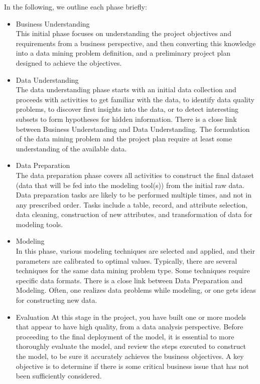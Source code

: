 In the following, we outline each phase briefly:
\begin{itemize}
\item Business Understanding\\
This initial phase focuses on understanding the project objectives and requirements from a
business perspective, and then converting this knowledge into a data mining problem
definition, and a preliminary project plan designed to achieve the objectives.
\item Data Understanding\\
The data understanding phase starts with an initial data collection and proceeds with activities
to get familiar with the data, to identify data quality problems, to discover first
insights into the data, or to detect interesting subsets to form hypotheses for hidden
information.
There is a close link between Business Understanding and Data Understanding. The
formulation of the data mining problem and the project plan require at least some
understanding of the available data.
\item Data Preparation\\
The data preparation phase covers all activities to construct the final dataset (data that will be
fed into the modeling tool(s)) from the initial raw data. Data preparation tasks are likely to be
performed multiple times, and not in any prescribed order. Tasks include a table, record, and attribute selection, data cleaning, construction of new attributes, and transformation of data for
modeling tools.
\item Modeling\\
In this phase, various modeling techniques are selected and applied, and their parameters are
calibrated to optimal values. Typically, there are several techniques for the same data mining
problem type. Some techniques require specific data formats.
There is a close link between Data Preparation and Modeling. Often, one realizes data
problems while modeling, or one gets ideas for constructing new data.
\item Evaluation
At this stage in the project, you have built one or more models that appear to have high quality,
from a data analysis perspective. Before proceeding to the final deployment of the model, it is
essential to more thoroughly evaluate the model, and review the steps executed to construct
the model, to be sure it accurately achieves the business objectives. A key objective is to
determine if there is some critical business issue that has not been sufficiently considered.

\end{itemize}
